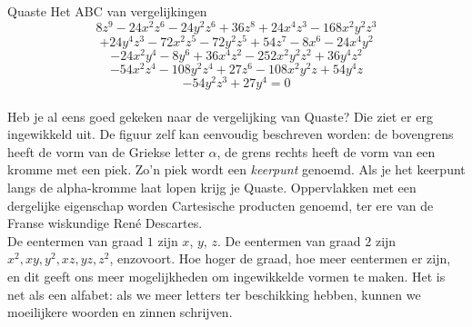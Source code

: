 \begin{surferPage}{Quaste}
Het ABC van vergelijkingen
  \smallskip
\[8z^9-24x^2z^6-24y^2z^6+36z^8+24x^4z^3-168x^2y^2z^3\]
\[+24y^4z^3-72x^2z^5-72y^2z^5+54z^7-8x^6-24x^4y^2\]
\[-24x^2y^4-8y^6 + 36x^4z^2-252x^2y^2z^2+36y^4z^2\]
\[- 54x^2z^4-108y^2z^4 + 27z^6-108x^2y^2z + 54y^4z\]
\[-54y^2z^3 + 27y^4 = 0\]\\
\vspace{0.3cm}
Heb je al eens goed gekeken naar de vergelijking van Quaste? Die ziet er erg ingewikkeld uit.
De figuur zelf kan eenvoudig beschreven worden: de bovengrens heeft de vorm van de Griekse letter $\alpha$, de grens rechts heeft de vorm van een kromme met een piek. Zo'n piek wordt een {\it keerpunt} genoemd. Als je het keerpunt langs de alpha-kromme laat lopen krijg je Quaste. Oppervlakken met een dergelijke eigenschap worden Cartesische producten genoemd, ter ere van de Franse wiskundige Ren\'e Descartes.\\
\vspace{0.3cm}
De eentermen van graad $1$ zijn $x$, $y$, $z$. De eentermen van graad $2$ zijn $x^2, xy, y^2, xz, yz, z^2$, enzovoort. Hoe hoger de graad, hoe meer eentermen er zijn, en dit geeft ons meer mogelijkheden om ingewikkelde vormen te maken. Het is net als een alfabet: als we meer letters ter beschikking hebben, kunnen we moeilijkere woorden en zinnen schrijven.
\end{surferPage}
